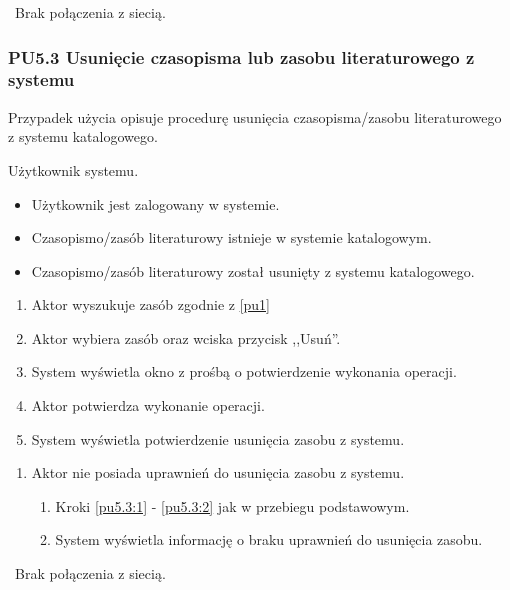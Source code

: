 \
Brak połączenia z siecią.

\subsubsection{PU5.3 Usunięcie czasopisma lub zasobu literaturowego z systemu}

Przypadek użycia opisuje procedurę usunięcia czasopisma/zasobu literaturowego z systemu katalogowego.

Użytkownik systemu.

\begin{itemize}
\item Użytkownik jest zalogowany w systemie.
\item Czasopismo/zasób literaturowy istnieje w systemie katalogowym.
\end{itemize}

\begin{itemize}
\item Czasopismo/zasób literaturowy został usunięty z systemu katalogowego.
\end{itemize}

\begin{enumerate}
\item \label{pu5.3:1} Aktor wyszukuje zasób zgodnie z \ref{pu1}
\item \label{pu5.3:2} Aktor wybiera zasób oraz wciska przycisk ,,Usuń''.
\item System wyświetla okno z prośbą o potwierdzenie wykonania operacji.
\item Aktor potwierdza wykonanie operacji.
\item System wyświetla potwierdzenie usunięcia zasobu z systemu.
\end{enumerate}

\begin{enumerate}
\item Aktor nie posiada uprawnień do usunięcia zasobu z systemu.
	\begin{enumerate}[label*=\arabic*.]
		\item Kroki \ref{pu5.3:1} - \ref{pu5.3:2} jak w przebiegu podstawowym.
		\item System wyświetla informację o braku uprawnień do usunięcia zasobu.
	\end{enumerate}
\end{enumerate}

\
Brak połączenia z siecią.